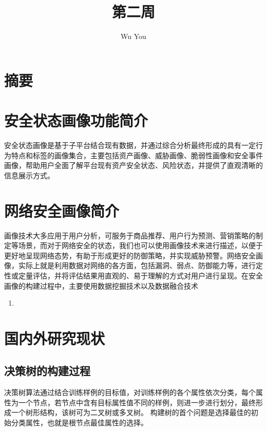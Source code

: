 \documentclass[a4papper]{article}
\title{}
\title{第二周}
\author{
Wu You\\ 
}
\begin{document}
\maketitle
\section*{摘要}

\newpage
\tableofcontents
\thispagestyle{empty}%
\newpage
\setcounter{page}{1}%
\setcounter{section}{0}%

\section{安全状态画像功能简介}
\par\setlength{\parindent}{2em} %
安全状态画像是基于子平台结合现有数据，并通过综合分析最终形成的具有一定行为特点和标签的画像集合，主要包括资产画像、威胁画像、脆弱性画像和安全事件画像，帮助用户全面了解平台现有资产安全状态、风险状态，并提供了直观清晰的信息展示方式。
\section{网络安全画像简介}
\par\setlength{\parindent}{2em} %
画像技术大多应用于用户分析，可服务于商品推荐、用户行为预测、营销策略的制定等场景，而对于网络安全的状态，我们也可以使用画像技术来进行描述，以便于更好地呈现网络态势，有助于形成更好的防御策略，并实现威胁预警。网络安全画像，实际上就是利用数据对网络的各方面，包括漏洞、弱点、防御能力等，进行定性或定量评估，并将评估结果用直观的、易于理解的方式对用户进行呈现。在安全画像的构建过程中，主要使用数据挖掘技术以及数据融合技术
\begin{enumerate}
\item  
\end{enumerate}
\section{国内外研究现状}
\par\setlength{\parindent}{2em} %

\subsection{决策树的构建过程}
\par\setlength{\parindent}{2em} %
决策树算法通过结合训练样例的目标值，对训练样例的各个属性依次分类，每个属性为一个节点，若节点中含有目标属性值不同的样例，则进一步进行划分，最终形成一个树形结构，该树可为二叉树或多叉树。
构建树的首个问题是选择最佳的初始分类属性，也就是根节点最佳属性的选择。
\end{document}
